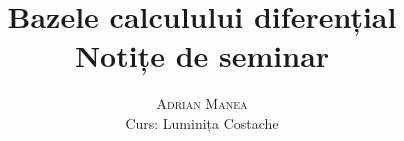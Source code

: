 \documentclass[12pt, a4paper]{book}
\begin{document}
\thispagestyle{empty}
\pagestyle{plain} %

\title{\huge\textbf{Bazele calculului diferențial} \\ \Large{Notițe de seminar}}
\vspace{1cm}
\author{\Large\textsc{Adrian Manea} \\ \large{Curs: Luminița Costache}}

\maketitle

\tableofcontents

\setcounter{page}{1} %














\renewcommand{\indexname}{Index}
\printindex



\nocite{*}
\end{document}
